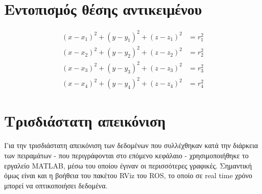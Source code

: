 \section{Εντοπισμός θέσης αντικειμένου}


\begin{align}
	(x-x_1)^2 + (y-y_1)^2 + (z-z_1)^2 &= r_1^2 \label{eq:trilateration-c1} \\ 
	(x-x_2)^2 + (y-y_2)^2 + (z-z_2)^2 &= r_2^2 \label{eq:trilateration-c2} \\
	(x-x_3)^2 + (y-y_3)^2 + (z-z_3)^2 &= r_3^2 \label{eq:trilateration-c3} \\
	(x-x_4)^2 + (y-y_4)^2 + (z-z_4)^2 &= r_4^2 \label{eq:trilateration-c4} 
\end{align}

\section{Τρισδιάστατη απεικόνιση}
Για την τρισδιάστατη απεικόνιση των δεδομένων που συλλέχθηκαν κατά την διάρκεια των πειραμάτων - που περιγράφονται στο επόμενο κεφάλαιο - χρησιμοποιήθηκε το εργαλείο MATLAB, μέσω του οποίου έγιναν οι περισσότερες γραφικές. Σημαντική όμως είναι και η βοήθεια του πακέτου RViz του ROS, το οποίο σε real time χρόνο μπορεί να οπτικοποιήσει δεδομένα.


